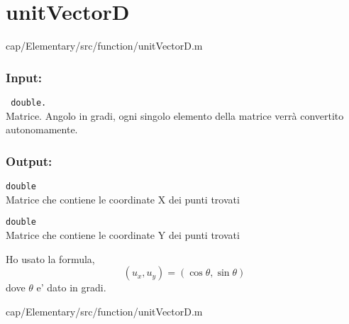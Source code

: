 \section{unitVectorD}\label{fnc:unitVectorD}


{cap/Elementary/src/function/unitVectorD.m}%

\subsubsection{Input:}
\begin{tcolorbox}
    \begin{description} 
        \setlength{\itemindent}{-.2in}%
        
        \item[\textit{angleD:}] \verb| double.|\\
        Matrice. Angolo in gradi, ogni singolo elemento della matrice verrà 
        convertito autonomamente.
    \end{description}
\end{tcolorbox}

\subsubsection{Output:}
\begin{tcolorbox}
    \begin{description}
        \setlength{\itemindent}{-.2in}
        
        \item[\textit{x:}] \verb|double| \\
        Matrice che contiene le coordinate X dei punti trovati
        
        \item[\textit{y:}] \verb|double| \\
        Matrice che contiene le coordinate Y dei punti trovati
    \end{description}
\end{tcolorbox}

{}

Ho usato la formula, $$(u_x , u_y)=(\cos\theta,\sin\theta)$$ 
dove $\theta$ e' dato in gradi.

{cap/Elementary/src/function/unitVectorD.m}%
\pagebreak

